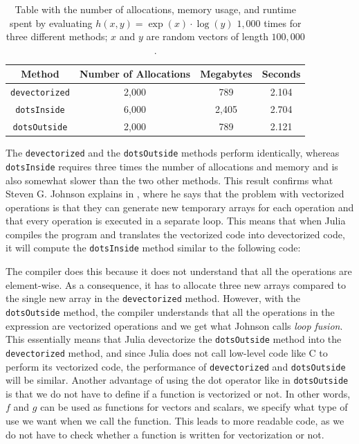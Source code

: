 \begin{table}[H]
    \centering
    \caption{Table  with  the  number  of  allocations,  memory  usage,  and  runtime  spent  by  evaluating $h(x,y) = \exp(x)\cdot\log(y)$ $1,000$ times for three different methods; $x$ and $y$ are random vectors of length $100,000$.}
    \label{tab:dotOperator}
    \def\arraystretch{1.5}
    \begin{tabular}{cccc}
    \textbf{Method} & \textbf{Number of Allocations} & \textbf{Megabytes} & \textbf{Seconds} \\
        \hline
         \texttt{devectorized} & 2,000 & 789 & 2.104 \\
         \texttt{dotsInside} & 6,000 & 2,405 & 2.704 \\ 
         \texttt{dotsOutside} & 2,000 & 789 & 2.121 \\  
         \hline
    \end{tabular}
\end{table}
The \texttt{devectorized} and the \texttt{dotsOutside} methods perform  identically, whereas \texttt{dotsInside} requires three times the number of allocations and memory and is also somewhat slower than the two other methods. This result confirms what Steven G. Johnson explains in \cite{MoreDotsJuliaBlog}, where he says that the problem with vectorized operations is that they can generate new temporary arrays for each operation and that every operation is executed in a separate loop. This means that when Julia compiles the program and translates the vectorized code into devectorized code, it will compute the \texttt{dotsInside} method similar to the following code:

The compiler does this because it does not understand that all the operations are element-wise. As a consequence, it has to allocate three new arrays compared to the single new array in the \texttt{devectorized} method. However, with the \texttt{dotsOutside} method, the compiler understands that all the operations in the expression are vectorized operations and we get what Johnson calls \textit{loop fusion}. This essentially means that Julia devectorize the \texttt{dotsOutside} method into the \texttt{devectorized} method, and since Julia does not call low-level code like C to perform its vectorized code, the performance of \texttt{devectorized} and \texttt{dotsOutside} will be similar. Another advantage of using the dot operator like in \texttt{dotsOutside} is that we do not have to define if a function is vectorized or not. In other words, $f$ and $g$ can be used as functions for vectors and scalars, we specify what type of use we want when we call the function. This leads to more readable code, as we do not have to check whether a function is written for vectorization or not.

